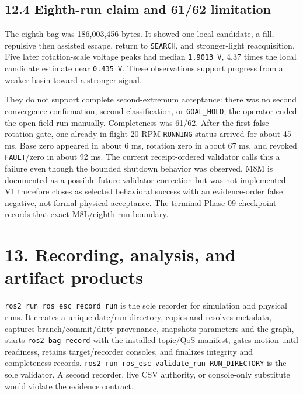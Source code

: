 \documentclass[
  10pt,
  letterpaper,
]{article}
\begin{document}
\subsection{12.4 Eighth-run claim and 61/62 limitation}\label{eighth-run-claim-and-6162-limitation}

The eighth bag was 186,003,456 bytes. It showed one local candidate, a fill,
repulsive then assisted escape, return to \nolinkurl{SEARCH}, and stronger-light
reacquisition. Five later rotation-scale voltage peaks had median \texttt{1.9013 V},
4.37 times the local candidate estimate near \texttt{0.435 V}. These observations
support progress from a weaker basin toward a stronger signal.

They do not support complete second-extremum acceptance: there was no second
convergence confirmation, second classification, or \nolinkurl{GOAL\_HOLD}; the operator
ended the open-field run manually. Completeness was 61/62. After the first
false rotation gate, one already-in-flight 20 RPM \nolinkurl{RUNNING} status arrived for
about 45 ms. Base zero appeared in about 6 ms, rotation zero in about 67 ms,
and revoked \nolinkurl{FAULT}/zero in about 92 ms. The current receipt-ordered validator
calls this a failure even though the bounded shutdown behavior was observed.
M8M is documented as a possible future validator correction but was not
implemented. V1 therefore closes as selected behavioral success with an
evidence-order false negative, not formal physical acceptance. The
\href{checkpoints/phase_09_checkpoint.txt}{terminal Phase 09 checkpoint} records
that exact M8L/eighth-run boundary.

\section{13. Recording, analysis, and artifact products}\label{recording-analysis-and-artifact-products}

\texttt{ros2 run ros\_esc record\_run} is the sole recorder for simulation and physical
runs. It creates a unique date/run directory, copies and resolves metadata,
captures branch/commit/dirty provenance, snapshots parameters and the graph,
starts \texttt{ros2 bag record} with the installed topic/QoS manifest, gates motion
until readiness, retains target/recorder consoles, and finalizes integrity and
completeness records. \texttt{ros2 run ros\_esc validate\_run RUN\_DIRECTORY} is the sole
validator. A second recorder, live CSV authority, or console-only substitute
would violate the evidence contract.
\end{document}
